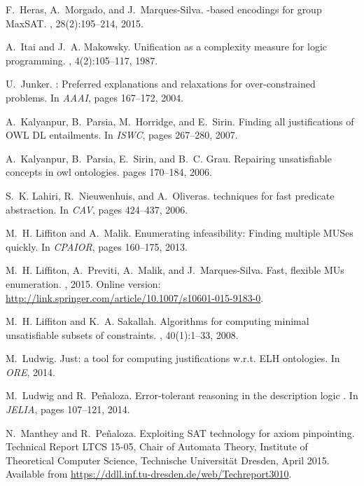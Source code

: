 \documentclass{llncs}
\begin{document}
\begin{thebibliography}{10}
F.~Heras, A.~Morgado, and J.~Marques{-}Silva.
-based encodings for group {MaxSAT}.
, 28(2):195--214, 2015.

A.~Itai and J.~A. Makowsky.
\newblock Unification as a complexity measure for logic programming.
, 4(2):105--117, 1987.

U.~Junker.
: Preferred explanations and relaxations for
  over-constrained problems.
\newblock In {\em AAAI}, pages 167--172, 2004.

A.~Kalyanpur, B.~Parsia, M.~Horridge, and E.~Sirin.
\newblock Finding all justifications of {OWL} {DL} entailments.
\newblock In {\em ISWC}, pages 267--280, 2007.

A.~Kalyanpur, B.~Parsia, E.~Sirin, and B.~C. Grau.
\newblock Repairing unsatisfiable concepts in owl ontologies.
\newblock pages 170--184, 2006.

S.~K. Lahiri, R.~Nieuwenhuis, and A.~Oliveras.
 techniques for fast predicate abstraction.
\newblock In {\em CAV}, pages 424--437, 2006.

M.~H. Liffiton and A.~Malik.
\newblock Enumerating infeasibility: Finding multiple {MUSes} quickly.
\newblock In {\em CPAIOR}, pages 160--175, 2013.

M.~H. Liffiton, A.~Previti, A.~Malik, and J.~Marques-Silva.
\newblock Fast, flexible {MU}s enumeration.
, 2015.
\newblock Online version:
  \url{http://link.springer.com/article/10.1007/s10601-015-9183-0}.

M.~H. Liffiton and K.~A. Sakallah.
\newblock Algorithms for computing minimal unsatisfiable subsets of
  constraints.
, 40(1):1--33, 2008.

M.~Ludwig.
\newblock Just: a tool for computing justifications {w.r.t.} {ELH} ontologies.
\newblock In {\em ORE}, 2014.

M.~Ludwig and R.~Pe{\~{n}}aloza.
\newblock Error-tolerant reasoning in the description logic .
\newblock In {\em JELIA}, pages 107--121, 2014.

N.~Manthey and R.~Pe{\~{n}}aloza.
\newblock Exploiting {SAT} technology for axiom pinpointing.
\newblock Technical Report LTCS 15-05, Chair of Automata Theory, Institute of
  Theoretical Computer Science, Technische Universit{\"{a}}t Dresden, April
  2015.
\newblock Available from
  \url{https://ddll.inf.tu-dresden.de/web/Techreport3010}.


\end{thebibliography}
\end{document}
